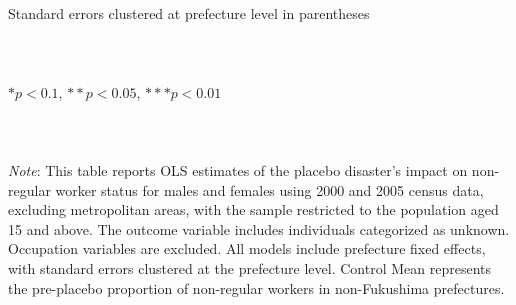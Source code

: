 \documentclass[serif, aspectratio=169]{beamer}
\begin{document}
\begin{frame}[label=nonregular_placebo]
\begin{table}[htbp]
\begin{tabular}{@{}l*{6}{c}@{}}
\bottomrule
\end{tabular}
\\\\{\linewidth}{\tiny Standard errors clustered at prefecture level in parentheses}\\\\
\\\\{\linewidth}{\tiny $*p<0.1$, $**p<0.05$, $***p<0.01$}\\\\
\\\\{\linewidth}{\tiny \textit{Note}: This table reports OLS estimates of the placebo disaster's impact on non-regular worker status for males and females using 2000 and 2005 census data, excluding metropolitan areas, with the sample restricted to the population aged 15 and above. The outcome variable includes individuals categorized as unknown. Occupation variables are excluded. All models include prefecture fixed effects, with standard errors clustered at the prefecture level. Control Mean represents the pre-placebo proportion of non-regular workers in non-Fukushima prefectures.}
\end{table}


\end{frame}

\end{document}
